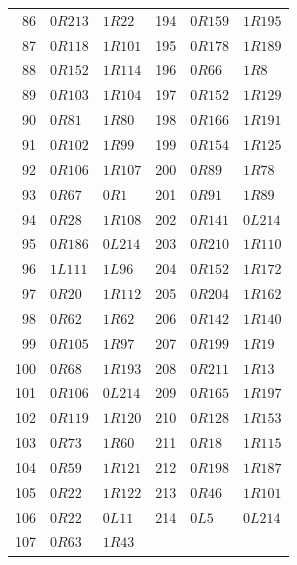 \begin{longtable}{rll@{\qquad}rll}
86 & $0R213$ & $1R22$ & 194 & $0R159$ & $1R195$\\
87 & $0R118$ & $1R101$ & 195 & $0R178$ & $1R189$\\
88 & $0R152$ & $1R114$ & 196 & $0R66$ & $1R8$\\
89 & $0R103$ & $1R104$ & 197 & $0R152$ & $1R129$\\
90 & $0R81$ & $1R80$ & 198 & $0R166$ & $1R191$\\
91 & $0R102$ & $1R99$ & 199 & $0R154$ & $1R125$\\
92 & $0R106$ & $1R107$ & 200 & $0R89$ & $1R78$\\
93 & $0R67$ & $0R1$ & 201 & $0R91$ & $1R89$\\
94 & $0R28$ & $1R108$ & 202 & $0R141$ & $0L214$\\
95 & $0R186$ & $0L214$ & 203 & $0R210$ & $1R110$\\
96 & $1L111$ & $1L96$ & 204 & $0R152$ & $1R172$\\
97 & $0R20$ & $1R112$ & 205 & $0R204$ & $1R162$\\
98 & $0R62$ & $1R62$ & 206 & $0R142$ & $1R140$\\
99 & $0R105$ & $1R97$ & 207 & $0R199$ & $1R19$\\
100 & $0R68$ & $1R193$ & 208 & $0R211$ & $1R13$\\
101 & $0R106$ & $0L214$ & 209 & $0R165$ & $1R197$\\
102 & $0R119$ & $1R120$ & 210 & $0R128$ & $1R153$\\
103 & $0R73$ & $1R60$ & 211 & $0R18$ & $1R115$\\
104 & $0R59$ & $1R121$ & 212 & $0R198$ & $1R187$\\
105 & $0R22$ & $1R122$ & 213 & $0R46$ & $1R101$\\
106 & $0R22$ & $0L11$ & 214 & $0L5$ & $0L214$\\
107 & $0R63$ & $1R43$ & & &\\
\bottomrule
\end{longtable}
\renewcommand{\arraystretch}{1}\normalsize

